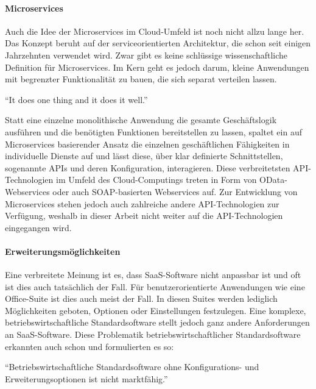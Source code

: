 \paragraph{Microservices}
Auch die Idee der Microservices im Cloud-Umfeld ist noch nicht allzu lange her. Das Konzept beruht auf der serviceorientierten Architektur, die schon seit einigen Jahrzehnten verwendet wird. Zwar gibt es keine schlüssige wissenschaftliche Definition für Microservices. Im Kern geht es jedoch darum, kleine Anwendungen mit begrenzter Funktionalität zu bauen, die sich separat verteilen lassen. \autocite{Familiar.2015}

\epigraph{
\centering
\enquote{It does one thing and it does it well.}
\autocite{Familiar.2015}
}{}

Statt eine einzelne monolithische Anwendung die gesamte Geschäftslogik ausführen und die benötigten Funktionen bereitstellen zu lassen, spaltet ein auf Microservices basierender Ansatz die einzelnen geschäftlichen Fähigkeiten in individuelle Dienste auf und lässt diese, über klar definierte  Schnittstellen, sogenannte \acf{API}s und deren Konfiguration, interagieren. Diese verbreitetsten \ac{API}-Technologien im Umfeld des Cloud-Computings treten in Form von \ac{OData}-Webservices oder auch \ac{SOAP}-basierten Webservices auf. Zur Entwicklung von Microservices stehen jedoch auch zahlreiche andere \ac{API}-Technologien zur Verfügung, weshalb in dieser Arbeit nicht weiter auf die \ac{API}-Technologien eingegangen wird.  
\autocite{Familiar.2015}

\paragraph{Erweiterungsmöglichkeiten}
Eine verbreitete Meinung ist es, dass \ac{SaaS}-Software nicht anpassbar ist und oft ist dies auch tatsächlich der Fall. Für benutzerorientierte Anwendungen wie eine Office-Suite ist dies auch meist der Fall. In diesen Suites werden lediglich Möglichkeiten geboten, Optionen oder Einstellungen festzulegen. Eine komplexe, betriebswirtschaftliche Standardsoftware stellt jedoch ganz andere Anforderungen an \ac{SaaS}-Software. Diese Problematik betriebswirtschaftlicher Standardsoftware erkannten auch schon \citeauthor{Schneider.2018} und formulierten es so:

\epigraph{
\enquote{Betriebswirtschaftliche Standardsoftware ohne Konfigurations- und Erweiterungsoptionen ist nicht marktfähig.}
\autocite{Schneider.2018}
}{}

